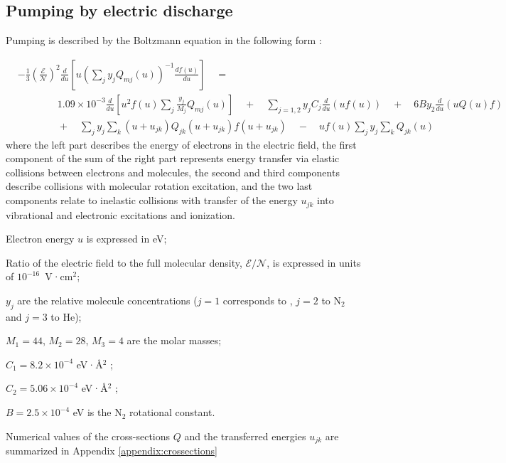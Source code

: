 \documentclass{report}
\begin{document}
\subsection{Pumping by electric discharge}
Pumping is described by the Boltzmann equation in the following form \cite{Holstein-1946,Nighan-1970}:

\begin{align}\label{eq:boltzmann}
&- \frac{1}{3} \left(\frac{\mathcal{E}}{\mathcal{N}}\right)^2 \frac{d}{du} \left[u \left( \sum\limits_j y_j Q_{mj}(u) \right)^{-1}\frac{df(u)}{du} \right] \quad = \nonumber \\
&\qquad \qquad 1.09 \times 10^{ - 3}\frac{d}{du}\left[ u^2 f(u)\sum\limits_j \frac{y_j}{M_j} Q_{mj}(u) \right]
\quad  + \quad \sum\limits_{j = 1,2} {y_j}{C_j} \frac{d}{du}(uf(u))
\quad  + \quad 6B y_2 \frac{d}{du}\left(uQ(u)f \right)\nonumber \\
&\qquad \qquad +\quad\sum\limits_j y_j \sum\limits_k (u + u_{jk})Q_{jk} (u + u_{jk})f(u + u_{jk}) \quad  - \quad uf(u)\sum\limits_j y_j \sum\limits_k Q_{jk}(u)
\end{align}
where the left part describes the energy of electrons in the electric field, the first component of the sum of the right part represents energy transfer via elastic collisions between electrons and molecules, the second and third components describe collisions with molecular rotation excitation, and the two last components relate to inelastic collisions with transfer of the energy $u_{jk}$ into vibrational and electronic excitations and ionization.

Electron energy $u$ is expressed in eV;

Ratio of the electric field to the full molecular density, $\mathcal{E}/\mathcal{N}$, is expressed in units of $10^{-16}$~V·cm$^2$;

$y_j$ are the relative molecule concentrations ($j=1$ corresponds to , $j=2$ to N$_2$ and $j=3$ to He);

$M_1=44$, $M_2=28$, $M_3=4$ are the molar masses;

$C_1 = 8.2 \times 10^{-4}$ eV·Å$^2$ \cite{Hake-1967};

$C_2 = 5.06 \times 10^{-4}$ eV·Å$^2$ \cite{Frost-1962};

$B = 2.5 \times 10^{-4}$ eV is the N$_2$ rotational constant.

Numerical values of the cross-sections $Q$ and the transferred energies $u_{jk}$ are summarized in Appendix \ref{appendix:crossections} 
\end{document}
